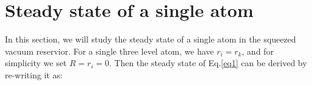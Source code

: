 \documentclass[aps,showpacs,twocolumn,twoside,groupedaddress]{revtex4}
\begin{document}
\section{Steady state of a single atom}

In this section, we will study the steady state of a single atom in the squeezed vacuum reservior. For a single three level atom, we have $r_i=r_k$, and for simplicity we set $R=r_i=0$. Then the steady state of Eq.\eqref{eq1} can be derived by re-writing it as:
\end{document}
